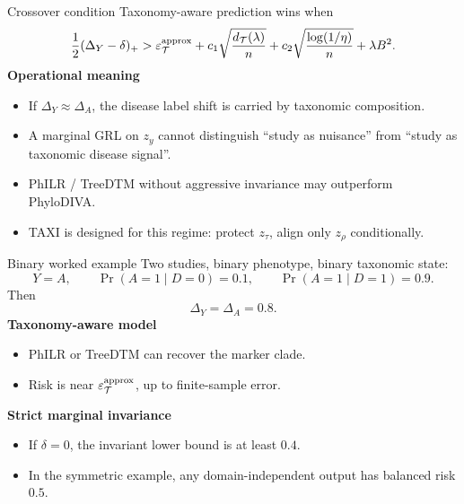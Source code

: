 \documentclass[aspectratio=169,10pt]{beamer}
\newcommand{\T}{\mathcal T}
\begin{document}
\begin{frame}{Crossover condition}
\small
Taxonomy-aware prediction wins when
\[
\frac12(\Delta_Y-\delta)_+
>
\varepsilon_{\T}^{\rm approx}
+c_1\sqrt{\frac{d_{\T}(\lambda)}{n}}
+c_2\sqrt{\frac{\log(1/\eta)}{n}}
+\lambda B^2.
\]
\textbf{Operational meaning}
\begin{itemize}
  \item If \(\Delta_Y\approx\Delta_A\), the disease label shift is carried by taxonomic composition.
  \item A marginal GRL on \(z_y\) cannot distinguish ``study as nuisance'' from ``study as taxonomic disease signal''.
  \item PhILR / TreeDTM without aggressive invariance may outperform PhyloDIVA.
  \item TAXI is designed for this regime: protect \(z_\tau\), align only \(z_\rho\) conditionally.
\end{itemize}
\end{frame}

\begin{frame}{Binary worked example}
\small
Two studies, binary phenotype, binary taxonomic state:
\[
Y=A,\qquad
\Pr(A=1\mid D=0)=0.1,\qquad
\Pr(A=1\mid D=1)=0.9.
\]
Then
\[
\Delta_Y=\Delta_A=0.8.
\]
\textbf{Taxonomy-aware model}
\begin{itemize}
  \item PhILR or TreeDTM can recover the marker clade.
  \item Risk is near \(\varepsilon_{\T}^{\rm approx}\), up to finite-sample error.
\end{itemize}
\textbf{Strict marginal invariance}
\begin{itemize}
  \item If \(\delta=0\), the invariant lower bound is at least \(0.4\).
  \item In the symmetric example, any domain-independent output has balanced risk \(0.5\).
\end{itemize}
\end{frame}
\end{document}
